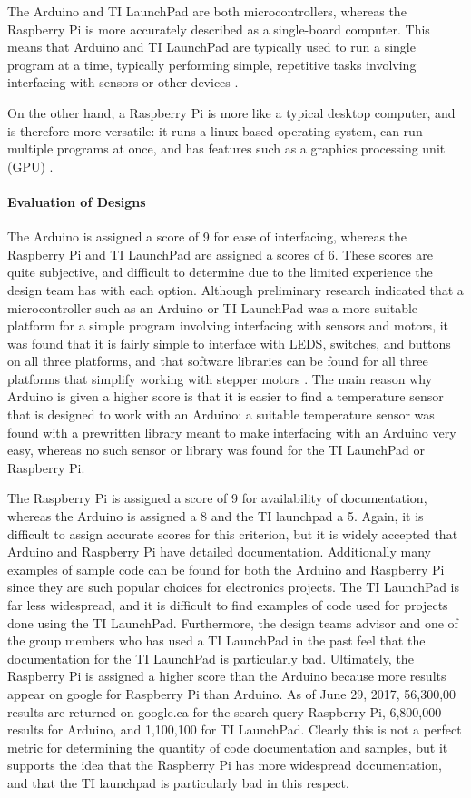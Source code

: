 \documentclass[11pt]{article}
\newcommand{\subsubsubsection}[1]{\paragraph{#1}\mbox{}}
\begin{document}
The Arduino and TI LaunchPad are both microcontrollers, whereas the Raspberry Pi is more accurately described as a single-board computer.
This means that Arduino and TI LaunchPad are typically used to run a single program at a time, typically performing simple, repetitive tasks involving interfacing with sensors or other devices \cite{eb1}\cite{arduino_pi}.

On the other hand, a Raspberry Pi is more like a typical desktop computer, and is therefore more versatile: it runs a linux-based operating system, can run multiple programs at once, and has features such as a graphics processing unit (GPU) \cite{arduino_pi}.

\subsubsubsection{Evaluation of Designs}

\noindent
The Arduino is assigned a score of 9 for ease of interfacing, whereas the Raspberry Pi and TI LaunchPad are assigned a scores of 6.
These scores are quite subjective, and difficult to determine due to the limited experience the design team has with each option.
Although preliminary research indicated that a microcontroller such as an Arduino or TI LaunchPad was a more suitable platform for a simple program involving interfacing with sensors and motors, it was found that it is fairly simple to interface with LEDS, switches, and buttons on all three platforms, and that software libraries can be found for all three platforms that simplify working with stepper motors \cite{eb2} \cite{eb3} \cite{eb4}.
 The main reason why Arduino is given a higher score is that it is easier to find a temperature sensor that is designed to work with an Arduino: a suitable temperature sensor was found with a prewritten library meant to make interfacing with an Arduino very easy, whereas no such sensor or library was found for the TI LaunchPad or Raspberry Pi.

The Raspberry Pi is assigned a score of 9 for availability of documentation, whereas the Arduino is assigned a 8 and the TI launchpad a 5.
Again, it is difficult to assign accurate scores for this criterion, but it is widely accepted that Arduino and Raspberry Pi have detailed documentation.
Additionally many examples of sample code can be found for both the Arduino and Raspberry Pi since they are such popular choices for electronics projects.
The TI LaunchPad is far less widespread, and it is difficult to find examples of code used for projects done using the TI LaunchPad.
Furthermore, the design teams advisor and one of the group members who has used a TI LaunchPad in the past feel that the documentation for the TI LaunchPad is particularly bad.
Ultimately, the Raspberry Pi is assigned a higher score than the Arduino because more results appear on google for Raspberry Pi than Arduino.
As of June 29, 2017, 56,300,00 results are returned on google.ca for the search query Raspberry Pi, 6,800,000 results for Arduino, and 1,100,100 for TI LaunchPad.
Clearly this is not a perfect metric for determining the quantity of code documentation and samples, but it supports the idea that the Raspberry Pi has more widespread documentation, and that the TI launchpad is particularly bad in this respect.
\end{document}

